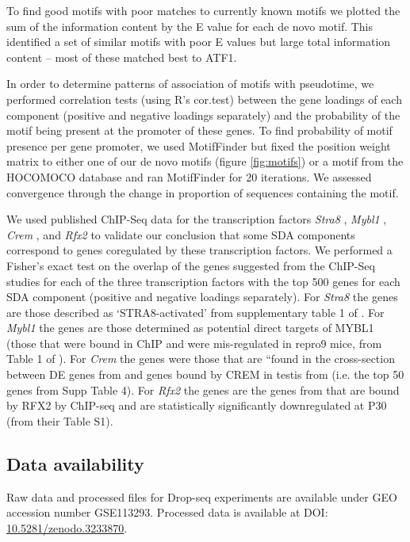 To find good motifs with poor matches to currently known motifs we plotted the sum of the information content by the E value for each de novo motif. This identified a set of similar motifs with poor E values but large total information content – most of these matched best to ATF1.

In order to determine patterns of association of motifs with pseudotime, we performed correlation tests (using R’s cor.test) between the gene loadings of each component (positive and negative loadings separately) and the probability of the motif being present at the promoter of these genes. To find probability of motif presence per gene promoter, we used MotifFinder but fixed the position weight matrix to either one of our de novo motifs (figure \ref{fig:motifs}) or a motif from the HOCOMOCO database and ran MotifFinder for 20 iterations. We assessed convergence through the change in proportion of sequences containing the motif.

We used published ChIP-Seq data for the transcription factors \textit{Stra8} \parencite{Kojima2019Amplification}, \textit{Mybl1} \parencite{Bolcun-Filas2011AMYB}, \textit{Crem} \parencite{Kosir2012Novel}, and \textit{Rfx2} \parencite{Kistler2015RFX2} to validate our conclusion that some SDA components correspond to genes coregulated by these transcription factors. We performed a Fisher’s exact test on the overlap of the genes suggested from the ChIP-Seq studies for each of the three transcription factors with the top 500 genes for each SDA component (positive and negative loadings separately). For \textit{Stra8} the genes are those described as ‘STRA8-activated’ from supplementary table 1 of \cite{Kojima2019Amplification}. For \textit{Mybl1} the genes are those determined as potential direct targets of MYBL1 (those that were bound in ChIP and were mis-regulated in repro9 mice, from Table 1 of \cite{Bolcun-Filas2011AMYB}). For \textit{Crem} the genes were those that are “found in the cross-section between DE genes from \cite{Kosir2012Novel} and genes bound by CREM in testis from \cite{Martianov2005Polar} (i.e. the top 50 genes from \cite{Kosir2012Novel} Supp Table 4). For \textit{Rfx2} the genes are the genes from \cite{Kistler2015RFX2} that are bound by RFX2 by ChIP-seq and are statistically significantly downregulated at P30 (from their Table S1).

\subsection{Data availability}

Raw data and processed files for Drop-seq experiments are available under GEO accession number GSE113293. Processed data is available at DOI: \href{http://www.doi.org/10.5281/zenodo.3233870}{10.5281/zenodo.3233870}.
